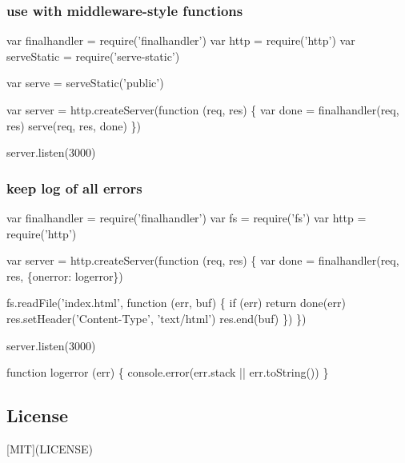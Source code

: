 \subsubsection*{use with middleware-\/style functions}


\begin{DoxyCode}
var finalhandler = require('finalhandler')
var http = require('http')
var serveStatic = require('serve-static')

var serve = serveStatic('public')

var server = http.createServer(function (req, res) \{
  var done = finalhandler(req, res)
  serve(req, res, done)
\})

server.listen(3000)
\end{DoxyCode}


\subsubsection*{keep log of all errors}


\begin{DoxyCode}
var finalhandler = require('finalhandler')
var fs = require('fs')
var http = require('http')

var server = http.createServer(function (req, res) \{
  var done = finalhandler(req, res, \{onerror: logerror\})

  fs.readFile('index.html', function (err, buf) \{
    if (err) return done(err)
    res.setHeader('Content-Type', 'text/html')
    res.end(buf)
  \})
\})

server.listen(3000)

function logerror (err) \{
  console.error(err.stack || err.toString())
\}
\end{DoxyCode}


\subsection*{License}

\mbox{[}M\+IT\mbox{]}(L\+I\+C\+E\+N\+SE) 